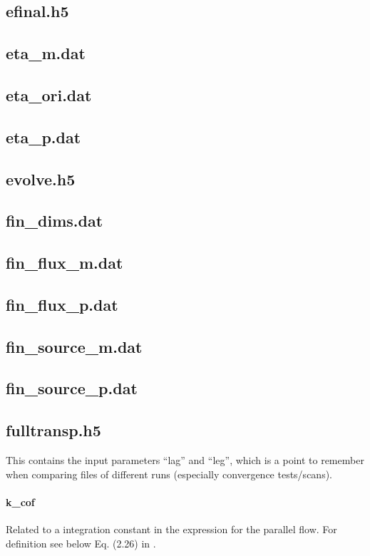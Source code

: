 \subsection{efinal.h5}

\subsection{eta\_m.dat}
\subsection{eta\_ori.dat}
\subsection{eta\_p.dat}

\subsection{evolve.h5}

\subsection{fin\_dims.dat}
\subsection{fin\_flux\_m.dat}
\subsection{fin\_flux\_p.dat}

\subsection{fin\_source\_m.dat}
\subsection{fin\_source\_p.dat}

\subsection{fulltransp.h5}
This contains the input parameters ``lag'' and ``leg'', which is a point
to remember when comparing files of different runs (especially
convergence tests/scans).

\paragraph{k\_cof}
Related to a integration constant in the expression for the parallel
flow. For definition see below Eq. (2.26) in \cite{Martitsch:Thesis:16}.

